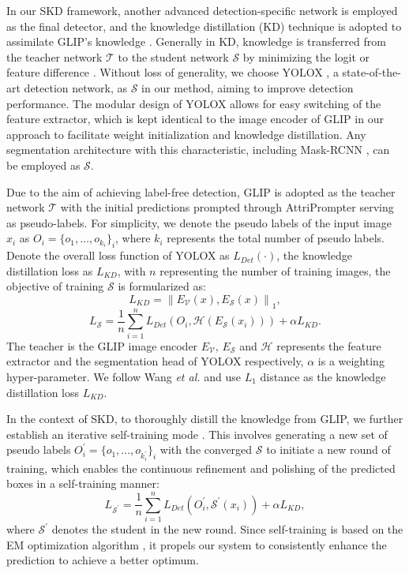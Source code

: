 \documentclass[journal,twoside,web]{ieeecolor}
\begin{document}
In our SKD framework, another advanced detection-specific network is employed as the final detector, and the knowledge distillation (KD) technique is adopted to assimilate GLIP’s knowledge \cite{hinton2015distilling}. Generally in KD, knowledge is transferred from the teacher network ${\mathcal{T}}$ to the student network ${\mathcal{S}}$ by minimizing the logit or feature difference \cite{hinton2015distilling, wang2021knowledge}. Without loss of generality, we choose YOLOX \cite{ge2021yolox}, a state-of-the-art detection network, as ${\mathcal{S}}$ in our method, aiming to improve detection performance. The modular design of YOLOX allows for easy switching of the feature extractor, which is kept identical to the image encoder of GLIP in our approach to facilitate weight initialization and knowledge distillation. Any segmentation architecture with this characteristic, including Mask-RCNN \cite{he2017mask}, can be employed as ${\mathcal{S}}$.

Due to the aim of achieving label-free detection, GLIP is adopted as the teacher network ${\mathcal{T}}$ with the initial predictions prompted through AttriPrompter serving as pseudo-labels. For simplicity, we denote the pseudo labels of the input image $x_{i}$ as $O_{i} =\{o_{1},\dots,o_{k_{i}}\}_{i}$, where $k_{i}$ represents the total number of pseudo labels. Denote the overall loss function of YOLOX as $L_{Det}(\cdot)$, the knowledge distillation loss as $L_{KD}$, with $n$ representing the number of training images, the objective of training ${\mathcal{S}}$ is formularized as:
\begin{equation}
\label{eq5}
L_{KD}=\left\|E_{\mathcal{V}}(x), E_{\mathcal{S}}(x)\right\|_1,
\end{equation}
\begin{equation}
\label{eq6}
L_{\mathcal{S}}=\frac{1}{n} \sum_{i=1}^n L_{Det}\left(O_i, \mathcal{H}\left(E_{\mathcal{S}}\left(x_i\right)\right)\right)+\alpha L_{KD}.
\end{equation}
The teacher is the GLIP image encoder $E_{\mathcal{V}}$, $E_{\mathcal{S}}$ and $\mathcal{H}$ represents the feature extractor and the segmentation head of YOLOX respectively, $\alpha$ is a weighting hyper-parameter. We follow Wang \textit{et al.} \cite{wang2023object} and use $L_{1}$ distance as the knowledge distillation loss $L_{KD}$.

In the context of SKD, to thoroughly distill the knowledge from GLIP, we further establish an iterative self-training mode \cite{dopido2013semisupervised}. This involves generating a new set of pseudo labels $O^{\prime}_{i} =\{o_{1},\dots,o_{k^{\prime}_{i}}\}_{i}$ with the converged $\mathcal{S}$ to initiate a new round of training, which enables the continuous refinement and polishing of the predicted boxes in a self-training manner:
\begin{equation}
L_{\mathcal{S}^{\prime}}=\frac{1}{n} \sum_{i=1}^n L_{Det}\left(O_i^{\prime}, \mathcal{S}^{\prime}\left(x_i\right)\right)+\alpha L_{KD},
\end{equation}
where $\mathcal{S}^{\prime}$ denotes the student in the new round. Since self-training is based on the EM optimization algorithm \cite{cheplygina2019not}, it propels our system to consistently enhance the prediction to achieve a better optimum.
\end{document}
